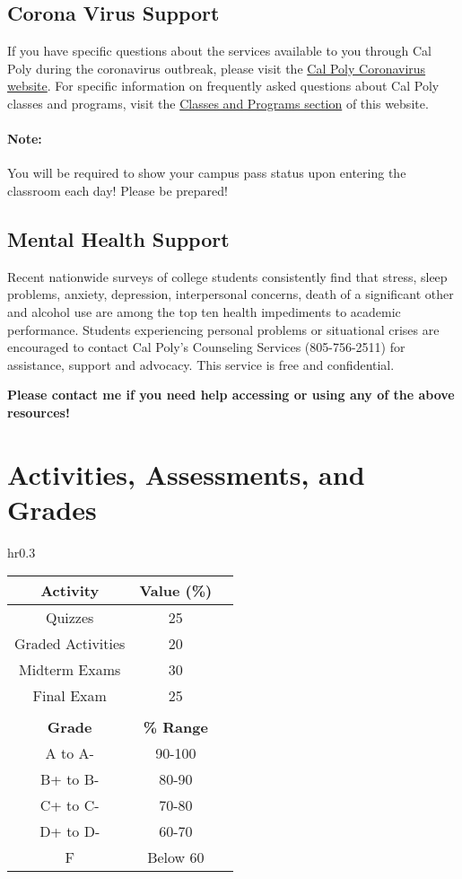 \documentclass{article}
\begin{document}
\subsection*{Corona Virus Support}
If you have specific questions about the services available to you through Cal Poly during the coronavirus outbreak, please visit the \href{http://coronavirus.calpoly.edu/}{Cal Poly Coronavirus website}. For specific information on frequently asked questions about Cal Poly classes and programs, visit the \href{https://coronavirus.calpoly.edu/classes-and-programs}{Classes and Programs section} of this website.
\paragraph{Note:} You will be required to show your campus pass status upon entering the classroom each day!  Please be prepared!

\subsection*{Mental Health Support}
Recent nationwide surveys of college students consistently find that stress, sleep problems, anxiety, depression, interpersonal concerns, death of a significant other and alcohol use are among the top ten health impediments to academic performance. Students experiencing personal problems or situational crises are encouraged to contact Cal Poly's Counseling Services (805-756-2511) for assistance, support and advocacy. This service is free and confidential.

\textbf{Please contact me if you need help accessing or using any of the above resources!}

\pagebreak

\section*{Activities, Assessments, and Grades}

\setlength{\intextsep}{-10pt}%
\setlength{\columnsep}{10pt}%

\begin{wraptable}{hr}{0.3\textwidth}
	\begin{tabular}{ccc}\\
		\textbf{Activity} & \textbf{Value (\%)}  \\ \hline
		Quizzes & 25 \\ \hline
		Graded Activities & 20\\ \hline
		Midterm Exams& 30\\ \hline
		Final Exam & 25 \\ \hline
		& \\ 
		\textbf{Grade} & \textbf{\% Range}  \\ \hline
		A to A- & 90-100 \\ \hline
		B+ to B- & 80-90 \\ \hline
		C+ to C- & 70-80 \\ \hline
		D+ to D- & 60-70 \\ \hline
		F & Below 60 \\ \hline
	\end{tabular}
\end{wraptable}
\end{document}
